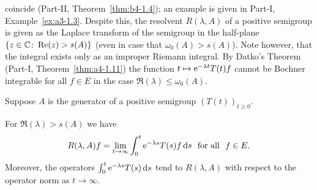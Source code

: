 coincide (\cf Part-II, Theorem~\ref{thm:b4-1.4}); an example is given in Part-I, Example~\ref{ex:a3-1.3}.
Despite this, the resolvent $R(\lambda,A)$ of a positive semigroup is given as the Laplace transform%
of the semigroup in the half-plane $\{z \in \mathbb{C}  \colon \mathop{}\!\mathrm{Re}(z) > s(A)\}$ (even in case that $\omega_0(A) > s(A)$).
Note however, that the integral exists only as an improper Riemann integral.
By Datko's Theorem (Part-I, Theorem~\ref{thm:a4-1.11}) the function $t \mapsto \mathrm{e}^{-\lambda t}T(t)f$ cannot be Bochner integrable for all $f \in E$ in the case $\Re(\lambda) \leq \omega_0(A)$.
\begin{theorem}\label{thm:c3-1.2}
	Suppose $A$ is the generator of a positive semigroup $(T(t))_{t\geq 0}$. 
	
	For\/ $\Re(\lambda) > s(A)$ we have
	\begin{equation}\label{eq:c3-1.1}
		R(\lambda,A)f = \lim_{t\to\infty} \int_{0}^t \mathrm{e}^{-\lambda s} T(s)f \mathop{}\!\mathrm{d}{s}  \ \text{ for all } \ f \in E.
	\end{equation}
	Moreover, the operators $\int_{0}^t \mathrm{e}^{-\lambda s} T(s) \mathop{}\!\mathrm{d}{s} $ tend to $R(\lambda,A)$ with respect to the operator norm as $t \to \infty$.
\end{theorem}

